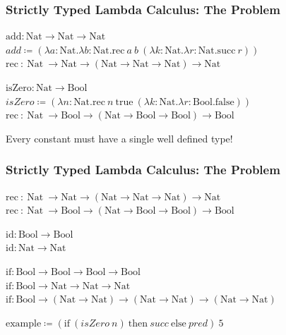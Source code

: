 \documentclass{beamer}
\newcommand{\bool}{\text{Bool}}
\newcommand{\nat}{\text{Nat}}
\newcommand{\true}{\text{true}}
\newcommand{\false}{\text{false}}
\newcommand{\suc}[1]{\text{succ}\ #1}
\newcommand{\ha}[3]{\text{if}\ #1\ \text{then}\ #2\ \text{else}\ #3}
\newcommand{\rec}[3]{\text{rec}\ #1\ #2\ #3}
\begin{document}
\begin{frame}[fragile]
  \frametitle{Strictly Typed Lambda Calculus: The Problem}

  $\text{add} : \nat \rightarrow \nat \rightarrow \nat$ \\
  $add \coloneqq (\lambda a : \nat . \lambda b : \nat . \rec{a}{b}{(\lambda k: \nat . \lambda r: \nat . \suc{r})}) $
  $\rec : \nat \rightarrow \nat \rightarrow (\nat \rightarrow \nat \rightarrow \nat) \rightarrow \nat$

  \vspace{5mm}

  $\text{isZero} : \nat \rightarrow \bool$ \\
  $isZero \coloneqq (\lambda n : \nat . \rec{n}{\true}{(\lambda k: \nat . \lambda r: \bool . \false)}) $ \\
  $\rec : \nat \rightarrow \bool \rightarrow (\nat \rightarrow \bool \rightarrow \bool) \rightarrow \bool$

  \vspace{5mm}

  Every constant must have a single well defined type!
\end{frame}

\begin{frame}[fragile]
  \frametitle{Strictly Typed Lambda Calculus: The Problem}

  $\rec : \nat \rightarrow \nat \rightarrow (\nat \rightarrow \nat \rightarrow \nat) \rightarrow \nat$ \\
  $\rec : \nat \rightarrow \bool \rightarrow (\nat \rightarrow \bool \rightarrow \bool) \rightarrow \bool$

  \vspace{5mm}

  $\text{id} : \bool \rightarrow \bool$ \\
  $\text{id} : \nat \rightarrow \nat$

  \vspace{5mm}

  $\text{if} : \bool \rightarrow \bool \rightarrow \bool \rightarrow \bool$ \\
  $\text{if} : \bool \rightarrow \nat \rightarrow \nat \rightarrow \nat$
  $\text{if} : \bool \rightarrow (\nat \rightarrow \nat) \rightarrow (\nat \rightarrow \nat) \rightarrow (\nat \rightarrow \nat)$

  \vspace{5mm}

  $\text{example} \coloneqq (\ha{(isZero\ n)}{succ}{pred})\ 5$
\end{frame}
\end{document}

